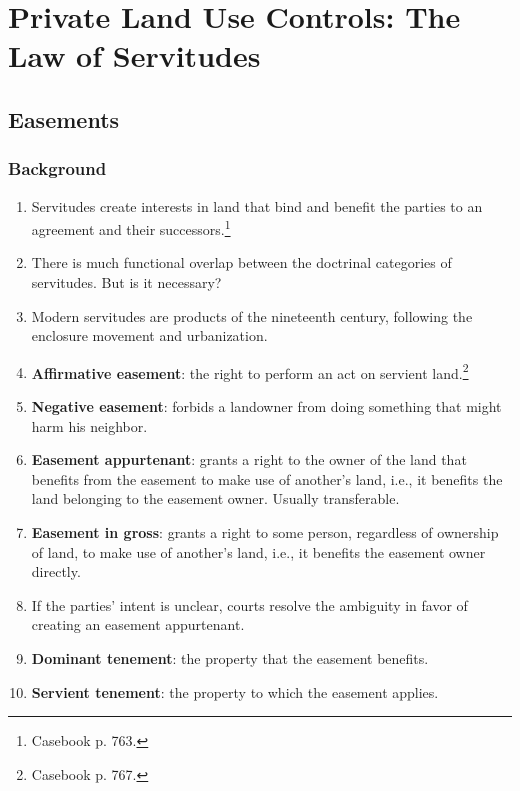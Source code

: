 \section{Private Land Use Controls: The Law of Servitudes}

\subsection{Easements}

\subsubsection{Background}

\begin{enumerate}
    \item Servitudes create interests in land that bind and benefit the 
    parties to an agreement and their successors.\footnote{Casebook p. 763.}
    \item There is much functional overlap between the doctrinal categories of 
    servitudes. But is it necessary?
    \item Modern servitudes are products of the nineteenth century, following 
    the enclosure movement and urbanization.
    \item \textbf{Affirmative easement}: the right to perform an act on 
    servient land.\footnote{Casebook p. 767.}
    \item \textbf{Negative easement}: forbids a landowner from doing something 
    that might harm his neighbor.
    \item \textbf{Easement appurtenant}: grants a right to the owner of the 
    land that benefits from the easement to make use of another's land, i.e., 
    it benefits the land belonging to the easement owner. Usually 
    transferable.
    \item \textbf{Easement in gross}: grants a right to some person, 
    regardless of ownership of land, to make use of another's land, i.e., it 
    benefits the easement owner directly. 
    \item If the parties' intent is unclear, courts resolve the ambiguity in 
    favor of creating an easement appurtenant.
    \item \textbf{Dominant tenement}: the property that the easement benefits.
    \item \textbf{Servient tenement}: the property to which the easement 
    applies.
\end{enumerate}


